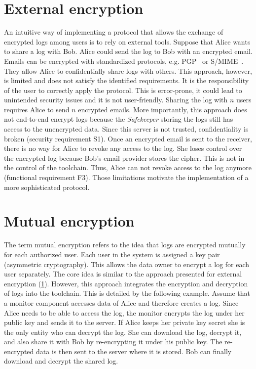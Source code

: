 \documentclass[../main.tex]{subfiles}
\begin{document}
\section{External encryption}
\label{sec:external-encryption}
An intuitive way of implementing a protocol that allows the exchange of encrypted logs among users is to rely on external tools.
Suppose that Alice wants to share a log with Bob.
Alice could send the log to Bob with an encrypted email.
Emails can be encrypted with standardized protocols, e.g. PGP~\cite{OpenPGP2007} or S/MIME~\cite{SMIME2009}.
They allow Alice to confidentially share logs with others.
This approach, however, is limited and does not satisfy the identified requirements.
It is the responsibility of the user to correctly apply the protocol.
This is error-prone, it could lead to unintended security issues and it is not user-friendly.
Sharing the log with $n$ users requires Alice to send $n$ encrypted emails.
More importantly, this approach does not end-to-end encrypt logs because the \emph{Safekeeper} storing the logs still has access to the unencrypted data.
Since this server is not trusted, confidentiality is broken (security requirement S1).
Once an encrypted email is sent to the receiver, there is no way for Alice to revoke any access to the log.
She loses control over the encrypted log because Bob's email provider stores the cipher.
This is not in the control of the toolchain.
Thus, Alice can not revoke access to the log anymore (functional requirement F3).
Those limitations motivate the implementation of a more sophisticated protocol.

\section{Mutual encryption}
\label{sec:mutual-encryption}
The term mutual encryption refers to the idea that logs are encrypted mutually for each authorized user.
Each user in the system is assigned a key pair (asymmetric cryptography).
This allows the data owner to encrypt a log for each user separately.
The core idea is similar to the approach presented for external encryption (\cref{sec:external-encryption}).
However, this approach integrates the encryption and decryption of logs into the toolchain.
This is detailed by the following example.
Assume that a monitor component accesses data of Alice and therefore creates a log.
Since Alice needs to be able to access the log, the monitor encrypts the log under her public key and sends it to the server.
If Alice keeps her private key secret she is the only entity who can decrypt the log.
She can download the log, decrypt it, and also share it with Bob by re-encrypting it under his public key.
The re-encrypted data is then sent to the server where it is stored.
Bob can finally download and decrypt the shared log.
\end{document}
